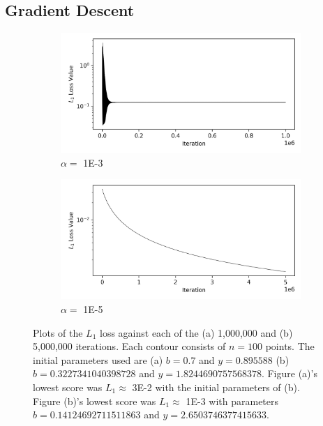 \documentclass[a4paper]{report}
\begin{document}
\subsection{Gradient Descent}
\begin{figure}[H]
    \begin{subfigure}{.5\linewidth}
      \includegraphics[width=\linewidth]{images/gd/GD_loss_plot.png}
      \caption{$\alpha =$ 1E-3}
      \label{fig:gd_1e-3}
    \end{subfigure}\hfill
    \begin{subfigure}{.5\linewidth}
      \includegraphics[width=\linewidth]{images/gd/GD_loss_plot2.png}
      \caption{$\alpha =$ 1E-5}
      \label{fig:gd_1e-5}
    \end{subfigure}
    
    \caption{Plots of the $L_1$ loss against each of the (a) 1,000,000 and (b) 5,000,000 iterations. Each contour consists of $n = 100$ points. The initial parameters used are (a) $b = 0.7$ and $y = 0.895588$ (b) $b = 0.3227341040398728$ and $y = 1.8244690757568378$. Figure (a)'s lowest score was $L_1 \approx$ 3E-2 with the initial parameters of (b). Figure (b)'s lowest score was $L_1 \approx$ 1E-3 with parameters $b = 0.14124692711511863$ and $y = 2.6503746377415633$.}
    \label{fig:GD_loss_plots}
\end{figure}
\end{document}
